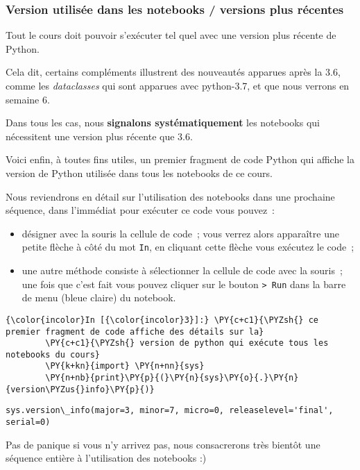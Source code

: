    \hypertarget{version-utilisuxe9e-dans-les-notebooks-versions-plus-ruxe9centes}{%
\subsubsection{Version utilisée dans les notebooks / versions plus
récentes}\label{version-utilisuxe9e-dans-les-notebooks-versions-plus-ruxe9centes}}

    Tout le cours doit pouvoir s'exécuter tel quel avec une version plus
récente de Python.

Cela dit, certains compléments illustrent des nouveautés apparues après
la 3.6, comme les \emph{dataclasses} qui sont apparues avec python-3.7,
et que nous verrons en semaine 6.

Dans tous les cas, nous \textbf{signalons systématiquement} les
notebooks qui nécessitent une version plus récente que 3.6.

    Voici enfin, à toutes fins utiles, un premier fragment de code Python
qui affiche la version de Python utilisée dans tous les notebooks de ce
cours.

Nous reviendrons en détail sur l'utilisation des notebooks dans une
prochaine séquence, dans l'immédiat pour exécuter ce code vous pouvez~:

\begin{itemize}
\tightlist
\item
  désigner avec la souris la cellule de code~; vous verrez alors
  apparaître une petite flèche à côté du mot \texttt{In}, en cliquant
  cette flèche vous exécutez le code~;
\item
  une autre méthode consiste à sélectionner la cellule de code avec la
  souris~; une fois que c'est fait vous pouvez cliquer sur le bouton
  \texttt{\textgreater{}\textbar{}\ Run} dans la barre de menu (bleue
  claire) du notebook.
\end{itemize}

    \begin{Verbatim}[commandchars=\\\{\},frame=single,framerule=0.3mm,rulecolor=\color{cellframecolor}]
{\color{incolor}In [{\color{incolor}3}]:} \PY{c+c1}{\PYZsh{} ce premier fragment de code affiche des détails sur la}
        \PY{c+c1}{\PYZsh{} version de python qui exécute tous les notebooks du cours}
        \PY{k+kn}{import} \PY{n+nn}{sys}
        \PY{n+nb}{print}\PY{p}{(}\PY{n}{sys}\PY{o}{.}\PY{n}{version\PYZus{}info}\PY{p}{)}
\end{Verbatim}


    \begin{Verbatim}[commandchars=\\\{\},frame=single,framerule=0.3mm,rulecolor=\color{cellframecolor}]
sys.version\_info(major=3, minor=7, micro=0, releaselevel='final', serial=0)
\end{Verbatim}

    Pas de panique si vous n'y arrivez pas, nous consacrerons très bientôt
une séquence entière à l'utilisation des notebooks :)


    
    
    
